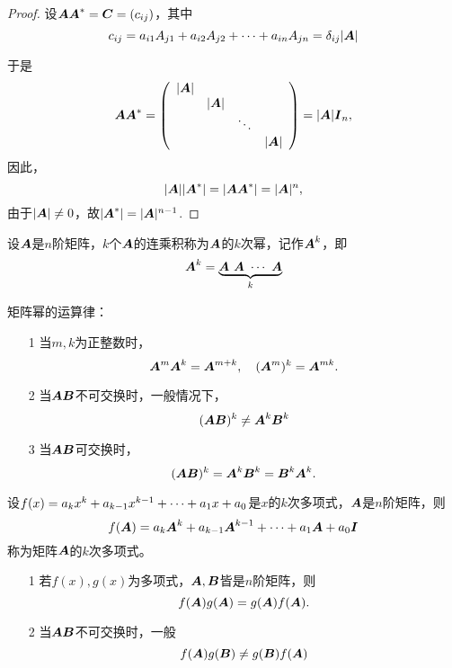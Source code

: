 \begin{frame}
\begin{proof}      
  设$\MA\MA^*=\MC=(c_{ij})$，其中
  $$
  c_{ij} = a_{i1}A_{j1} + a_{i2}A_{j2} + \cd + a_{in}A_{jn} = \delta_{ij}|\MA|
  $$
  
  于是
  $$
  \MA\MA^* = \left(
    \begin{array}{cccc}
      |\MA|&&&\\
          &|\MA|&&\\
          &&\dd&\\
          &&&|\MA|
    \end{array}
  \right) = |\MA| \MI_n,
  $$ 
  因此，
  $$
  |\MA||\MA^*| = |\MA\MA^*| = |\MA|^n,
  $$ 
  由于$|\MA|\ne 0$，故$|\MA^*|=|\MA|^{n-1}$.
\end{proof}
\end{frame}

\begin{frame}

\begin{dingyi}[矩阵幂]
  设$\MA$是$n$阶矩阵，$k$个$\MA$的连乘积称为$\MA$的$k$次幂，记作$\MA^k$，即
  $$
  \MA^k = \underbrace{\MA~ \MA~ \cd ~\MA}_{k}
  $$
\end{dingyi}
\end{frame}

\begin{frame}
矩阵幂的运算律：
\begin{itemize}
\item[1] 当$m,k$为正整数时，
  $$
  \MA^m \MA^k = \MA^{m+k}, \quad
  (\MA^m)^k = \MA^{mk}.
  $$  
\item[2]
  当$\MA\MB$不可交换时，一般情况下，
  $$
  (\MA\MB)^k \ne \MA^k\MB^k 
  $$  
\item[3]
  当$\MA\MB$可交换时，
  $$
  (\MA\MB)^k = \MA^k\MB^k =  \MB^k\MA^k. 
  $$
\end{itemize}
\end{frame}

\begin{frame}
\begin{dingyi}[矩阵多项式]
  设$f(x)=a_kx^k+a_{k-1}x^{k-1}+\cd+a_1x+a_0$是$x$的$k$次多项式，$\MA$是$n$阶矩阵，则
  $$
  f(\MA)=a_k\MA^k+a_{k-1}\MA^{k-1}+\cd+a_1\MA+a_0\MI
  $$
  称为矩阵$\MA$的$k$次多项式。
\end{dingyi}
\pause 
% 
\begin{zhu}
  \begin{itemize}
  \item[1] 若$f(x), g(x)$为多项式，$\MA,\MB$皆是$n$阶矩阵，则
    $$
    f(\MA)g(\MA) = g(\MA)f(\MA).
    $$
  \item[2] 当$\MA\MB$不可交换时，一般
    $$f(\MA)g(\MB)\ne g(\MB)f(\MA)$$
  \end{itemize}
\end{zhu}
\end{frame}